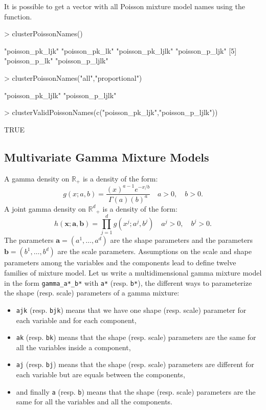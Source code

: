 \documentclass[shortnames,nojss,article]{jss}
\newcommand{\R}{\mathbb{R}}
\newcommand{\Rd}{{\mathbb{R}^d}}
\newcommand{\ba}{\mathbf{a}}
\newcommand{\bb}{\mathbf{b}}
\newcommand{\bx}{\mathbf{x}}
\begin{document}
It is possible to get a vector with all Poisson mixture model names using
the  function.
\begin{Schunk}
\begin{Sinput}
> clusterPoissonNames()
\end{Sinput}
\begin{Soutput}
[1] "poisson_pk_ljk"  "poisson_pk_lk"   "poisson_pk_ljlk" "poisson_p_ljk"  
[5] "poisson_p_lk"    "poisson_p_ljlk" 
\end{Soutput}
\begin{Sinput}
> clusterPoissonNames("all","proportional")
\end{Sinput}
\begin{Soutput}
[1] "poisson_pk_ljlk" "poisson_p_ljlk" 
\end{Soutput}
\begin{Sinput}
> clusterValidPoissonNames(c("poisson_pk_ljk","poisson_p_ljlk"))
\end{Sinput}
\begin{Soutput}
[1] TRUE
\end{Soutput}
\end{Schunk}

\subsection{Multivariate Gamma Mixture Models}
\label{subsec:Gamma}

A gamma density on $\R_+$ is a density of the form:
\begin{equation}\label{law::gamma-density}
g(x;a,b) = \frac{ \left(x\right)^{a-1} e^{-x/b}}{\Gamma(a) \left(b\right)^{a}} \quad a>0, \quad b>0.
\end{equation}
A joint gamma density on $\Rd_+$ is a density of the form:
\begin{equation}\label{law::joint-gamma-density}
h(\bx;\ba,\bb) = \prod_{j=1}^d g(x^j;a^j,b^j) \quad a^j>0, \quad b^j>0.
\end{equation}
The parameters $\ba=(a^1,\ldots,a^d)$ are the shape parameters and the
parameters $\bb=(b^1,\ldots,b^d)$ are the scale parameters. Assumptions on the
scale and shape parameters among the variables and the components lead to
define twelve families of mixture model. Let us write a multidimensional gamma
mixture model in the form \verb+gamma_a*_b*+ with \verb+a*+ (resp. \verb+b*+),
the different ways to parameterize the shape (resp. scale) parameters of a
gamma mixture:
\begin{itemize}
\item \verb+ajk+ (resp. \verb+bjk+) means that we have one shape (resp. scale)
parameter for each variable and for each component,
\item \verb+ak+ (resp. \verb+bk+) means that the shape (resp. scale) parameters
are the same for all the variables inside a component,
\item \verb+aj+ (resp. \verb+bj+) means that the shape (resp. scale) parameters
are different for each variable but are equals between the components,
\item and finally \verb+a+ (resp. \verb+b+) means that the shape (resp. scale)
parameters are the same for all the variables and all the components.
\end{itemize}
\end{document}
